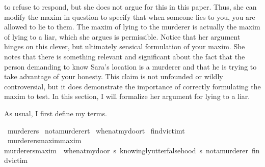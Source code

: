 \begin{isabellebody}
\begin{isamarkuptext}
{to refuse to respond, but she does not argue for this in this paper.} Thus, she can modify the maxim in 
question to specify that when someone lies to you, you are allowed to lie to them. The maxim of lying 
to the murderer is actually the maxim of lying to a liar, which she argues is permissible. Notice that
her argument hinges on this clever, but ultimately sensical formulation of your maxim. She notes
that there is something relevant and significant about the fact that the person demanding to know Sara's
location is a murderer and that he is trying to take advantage of your honesty. This claim is not
unfounded or wildly controversial, but it does demonstrate the importance of correctly formulating
the maxim to test. In this section, I will formalize her argument for lying to a liar.

As usual, I first define my terms.%
\end{isamarkuptext}\isamarkuptrue%
\isamarkupfalse%
\ murderer{\isacharcolon}{\isacharcolon}s\isanewline
%
\isanewline
{}\isamarkupfalse%
\ not{\isacharunderscore}a{\isacharunderscore}murderer{\isacharcolon}{\isacharcolon}t\isanewline
%
\isanewline
{}\isamarkupfalse%
\ when{\isacharunderscore}at{\isacharunderscore}my{\isacharunderscore}door{\isacharcolon}{\isacharcolon}t\isanewline
%
\isanewline
{}\isamarkupfalse%
\ find{\isacharunderscore}victim{\isacharcolon}{\isacharcolon}t\isanewline
%
\isanewline
{}\isamarkupfalse%
\ murderers{\isacharunderscore}maxim{\isacharcolon}{\isacharcolon}{\isachardoublequoteopen}maxim{\isachardoublequoteclose}\ \ \isanewline
{\isachardoublequoteopen}murderers{\isacharunderscore}maxim\ {\isasymequiv}\ {\isacharparenleft}when{\isacharunderscore}at{\isacharunderscore}my{\isacharunderscore}door{\isacharcomma}\ {\isasymlambda}s{\isachardot}\ knowingly{\isacharunderscore}utter{\isacharunderscore}falsehood\ s\ not{\isacharunderscore}a{\isacharunderscore}murderer{\isacharcomma}\ find{\isacharunderscore}victim{\isacharparenright}{\isachardoublequoteclose}\isanewline
%
\end{isabellebody}
